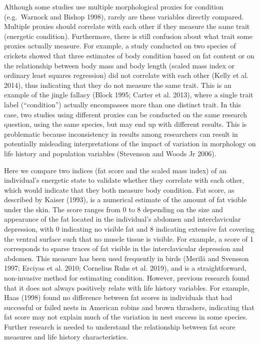 \documentclass[
]{article}
\begin{document}
Although some studies use multiple morphological proxies for condition
(e.g.~Warnock and Bishop 1998), rarely are these variables directly
compared. Multiple proxies should correlate with each other if they
measure the same trait (energetic condition). Furthermore, there is
still confusion about what trait some proxies actually measure. For
example, a study conducted on two species of crickets showed that three
estimates of body condition based on fat content or on the relationship
between body mass and body length (scaled mass index or ordinary least
squares regression) did not correlate with each other (Kelly et al.
2014), thus indicating that they do not measure the same trait. This is
an example of the jingle fallacy (Block 1995; Carter et al. 2013), where
a single trait label (``condition'') actually encompasses more than one
distinct trait. In this case, two studies using different proxies can be
conducted on the same research question, using the same species, but may
end up with different results. This is problematic because inconsistency
in results among researchers can result in potentially misleading
interpretations of the impact of variation in morphology on life history
and population variables (Stevenson and Woods Jr 2006).

Here we compare two indices (fat score and the scaled mass index) of an
individual's energetic state to validate whether they correlate with
each other, which would indicate that they both measure body condition.
Fat score, as described by Kaiser (1993), is a numerical estimate of the
amount of fat visible under the skin. The score ranges from 0 to 8
depending on the size and appearance of the fat located in the
individual's abdomen and interclavicular depression, with 0 indicating
no visible fat and 8 indicating extensive fat covering the ventral
surface such that no muscle tissue is visible. For example, a score of 1
corresponds to sparse traces of fat visible in the interclavicular
depression and abdomen. This measure has been used frequently in birds
(Merilä and Svensson 1997; Erciyas et al. 2010; Cornelius Ruhs et al.
2019), and is a straightforward, non-invasive method for estimating
condition. However, previous research found that it does not always
positively relate with life history variables. For example, Haas (1998)
found no difference between fat scores in individuals that had
successful or failed nests in American robins and brown thrashers,
indicating that fat score may not explain much of the variation in nest
success in some species. Further research is needed to understand the
relationship between fat score measures and life history
characteristics.
\end{document}
